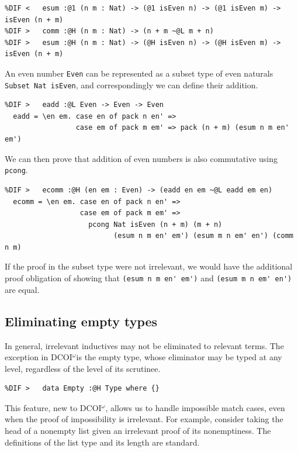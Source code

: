 \documentclass[acmsmall, screen=true, nonacm=true,
  review=\ifpublic false\else true\fi,
  anonymous=\ifanonymous true\else false\fi
]{acmart}
\makeatletter
\newcommand{\name}{\texorpdfstring{DCOI$^{\omega}$\@\xspace}{DCOI-omega}}
\providecommand{\DIFmodbegin}{} %
\providecommand{\DIFmodend}{} %
\makeatother
\begin{document}
\DIFmodbegin
\begin{lstlisting}[alsolanguage=DIFcode]
%DIF <   comm :@1 (n m : Nat) -> (n + m ~@0 m + n)
%DIF <   esum :@1 (n m : Nat) -> (@1 isEven n) -> (@1 isEven m) -> isEven (n + m)
%DIF >   comm :@H (n m : Nat) -> (n + m ~@L m + n)
%DIF >   esum :@H (n m : Nat) -> (@H isEven n) -> (@H isEven m) -> isEven (n + m)
\end{lstlisting}
\DIFmodend

An even number \lstinline{Even} can be represented
as a subset type of even naturals \lstinline{Subset Nat isEven},
and correspondingly we can define their addition.

\DIFmodbegin
\begin{lstlisting}[alsolanguage=DIFcode]
%DIF <   eadd :@0 Even -> Even -> Even
%DIF >   eadd :@L Even -> Even -> Even
  eadd = \en em. case en of pack n en' =>
                 case em of pack m em' => pack (n + m) (esum n m en' em')
\end{lstlisting}
\DIFmodend

We can then prove that addition of even numbers is also commutative using \lstinline{pcong}.

\DIFmodbegin
\begin{lstlisting}[alsolanguage=DIFcode]
%DIF <   ecomm :@1 (en em : Even) -> (eadd en em ~@0 eadd em en)
%DIF >   ecomm :@H (en em : Even) -> (eadd en em ~@L eadd em en)
  ecomm = \en em. case en of pack n en' =>
                  case em of pack m em' =>
                    pcong Nat isEven (n + m) (m + n)
                          (esum n m en' em') (esum m n em' en') (comm n m)
\end{lstlisting}
\DIFmodend

If the proof in the subset type were not irrelevant,
we would have the additional proof obligation of showing that
\lstinline{(esum n m en' em')} and
\lstinline{(esum m n em' en')} are equal.

\subsection{Eliminating empty types}

In general, irrelevant inductives may not be eliminated to relevant terms.
The exception in \name is the empty type,
whose eliminator may be typed at any level,
regardless of the level of its scrutinee.
\DIFmodbegin
\begin{lstlisting}[alsolanguage=DIFcode]
%DIF <   data Empty :@1 Type where {}
%DIF >   data Empty :@H Type where {}
\end{lstlisting}
\DIFmodend
\noindent
This feature, new to \name, allows us to handle impossible match cases,
even when the proof of impossibility is irrelevant.
For example, consider taking the head of a nonempty list
given an irrelevant proof of its nonemptiness. The definitions of the
list type and its length are standard.
\end{document}
